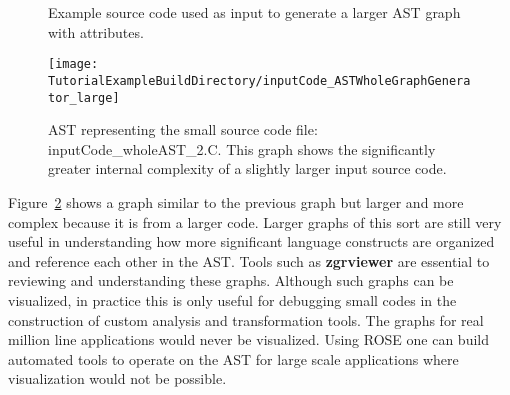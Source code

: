 
\begin{figure}[!h]
{\indent
{\mySmallFontSize

\begin{latexonly}
   
\end{latexonly}

\begin{htmlonly}
   
\end{htmlonly}

}
}
\caption{Example source code used as input to generate a larger AST graph with attributes.}
\label{Tutorial:exampleInputCode_ASTGraphGenerator_large}
\end{figure}

\begin{figure}
\texttt{[image: \\TutorialExampleBuildDirectory/inputCode\_ASTWholeGraphGenerator\_large]}
\caption{AST representing the small source code file: inputCode\_wholeAST\_2.C. This
    graph shows the significantly greater internal complexity of a slightly larger 
    input source code.}
\label{tutorial:exampleOutputCodeWholeGraph_large}
\end{figure}

   Figure~\ref{tutorial:exampleOutputCodeWholeGraph_large} shows a graph similar to the
previous graph but larger and more complex because it is from a larger code. Larger
graphs of this sort are still very useful in understanding how more significant
language constructs are organized and reference each other in the AST.  Tools
such as {\bf zgrviewer} are essential to reviewing and understanding these
graphs. Although such graphs can be visualized, in practice this is only useful
for debugging small codes in the construction of custom analysis and transformation
tools. The graphs for real million line applications would never be visualized.
Using ROSE one can build automated tools to operate on the AST for large scale
applications where visualization would not be possible.


